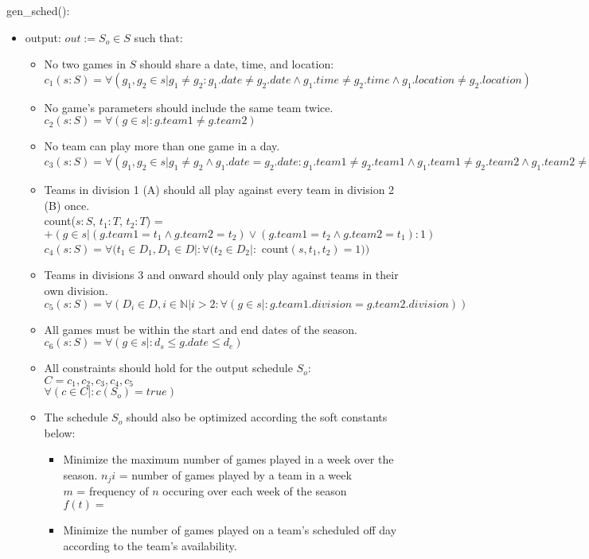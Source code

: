 \documentclass[12pt, titlepage]{article}
\begin{document}
\noindent gen\_sched():
\begin{itemize}
\item output: $out := S_o \in S$ such that:
\begin{itemize}
  \item No two games in $S$ should share a date, time, and location:\\
  $c_1(s:S) = \forall(g_1, g_2 \in s | g_1 \neq g_2 : g_1.date \neq
  g_2.date \land g_1.time \neq g_2.time \land g_1.location \neq g_2.location)$
  \item No game's parameters should include the same team twice.\\
  $c_2(s:S) = \forall (g \in s |: g.team1 \neq g.team2)$
  \item No team can play more than one game in a day.\\
  $c_3(s:S) = \forall (g_1, g_2 \in s |g_1 \neq g_2 \land g_1.date =
  g_2.date : g_1.team1 \neq g_2.team1 \land g_1.team1 \neq g_2.team2 \land
  g_1.team2 \neq g_2.team1 \land g_1.team2 \neq g_2.team2)$
  \item Teams in division 1 (A) should all play against every team in division
  2 (B) once.\\
  count($s:S$, $t_1:T$, $t_2:T$) = $+(g \in s | (g.team1 = t_1 \land
  g.team2 = t_2) \lor (g.team1 = t_2 \land g.team2 = t_1) : 1)$\\
  $c_4(s:S) = \forall (t_1 \in D_1, D_1 \in D |: \forall (t_2 \in D_2 |:$ count$(s, t_1,
  t_2) = 1))$
  \item Teams in divisions 3 and onward should only play against teams in
  their own division.\\
  $c_5(s:S) = \forall (D_i \in D, i \in \mathbb{N} | i > 2 : \forall (g \in s |:
  g.team1.division = g.team2.division))$
  \item All games must be within the start and end dates of the season.\\
  $c_6(s:S) = \forall (g \in s |: d_s \leq g.date \leq d_e)$
  \item All constraints should hold for the output schedule $S_o$:\\
  $C = {c_1, c_2, c_3, c_4, c_5}$\\
  $\forall(c \in C |: c(S_o) = true)$
  \item The schedule $S_o$ should also be optimized according the soft
  constants below:
  \begin{itemize}
    \item Minimize the maximum number of games played in a week over the
    season.
    $n_ji$ = number of games played by a team in a week\\
    $m$ = frequency of $n$ occuring over each week of the season\\
    $f(t) = $
    \item Minimize the number of games played on a team's scheduled off day
    according to the team's availability.
  \end{itemize}
\end{itemize}
\end{itemize}
\end{document}
